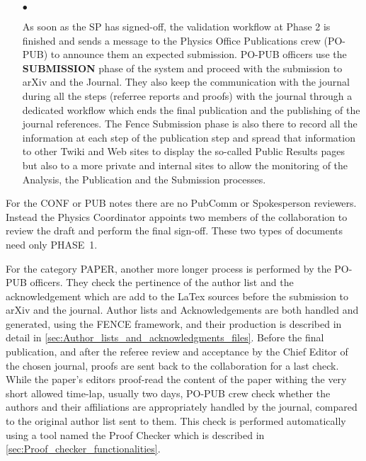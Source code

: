 \begin{itemize}
    \item[$\bullet$]
    
As soon as the SP has signed-off, the validation workflow at Phase 2 is finished and sends a message to the Physics Office Publications crew (PO-PUB) to announce them an expected submission. PO-PUB officers use the \textbf{SUBMISSION} phase of the system and proceed with the submission to arXiv and the Journal. They also keep the communication with the journal during all the steps (referree reports and proofs) with the journal through a dedicated  workflow which ends  the final publication and the publishing of the journal references. The Fence Submission phase is also there to record all the information at each step of the publication step and spread that information to other Twiki and Web sites to display the so-called Public Results pages but also to a more private and internal sites to allow the monitoring of the Analysis, the Publication and the Submission processes.

\end{itemize}

For the CONF or PUB notes there are no PubComm or Spokesperson reviewers. Instead the Physics Coordinator appoints two members of the collaboration to review the draft and perform the final sign-off. These two types of documents need only PHASE~1.

For the category PAPER,  another more longer process is performed by the PO-PUB officers. They check the pertinence of the author list and the acknowledgement which are add to the LaTex sources before the submission to  arXiv and the journal. Author lists and Acknowledgements are both  handled and generated, using the FENCE framework, and their production is described in detail in \cref{sec:Author_lists_and_acknowledgments_files}. Before the final publication, and after the referee review and acceptance by the Chief Editor of the chosen journal, proofs are sent back to the collaboration for a last check.  While the paper's editors proof-read the content of the paper withing the very short allowed time-lap, usually two days, PO-PUB crew check whether the authors and their affiliations are appropriately handled by the journal, compared to the original author list sent to them. This check is performed automatically using a tool named  the Proof Checker which is described in \cref{sec:Proof_checker_functionalities}.